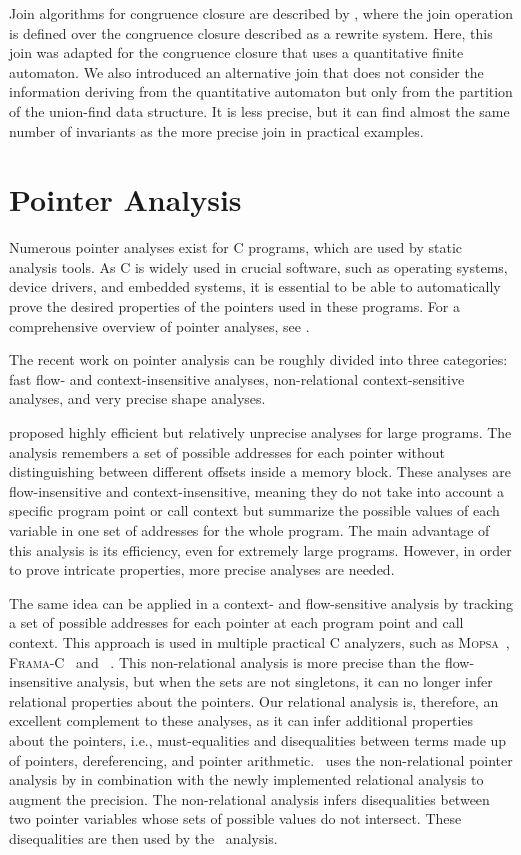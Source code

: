 Join algorithms for congruence closure are described by \textcite{join}, where the join operation is defined over the congruence closure described as a rewrite system.
Here, this join was adapted for the congruence closure that uses a quantitative finite automaton.
We also introduced an alternative join that does not consider the information deriving from the quantitative automaton but only from the partition of the union-find data structure.
It is less precise, but it can find almost the same number of invariants as the more precise join in practical examples.

\section{Pointer Analysis}

Numerous pointer analyses exist for C programs, which are used by static analysis tools.
As C is widely used in crucial software, such as operating systems, device drivers, and embedded systems, it is essential to be able to automatically prove the desired properties of the pointers used in these programs.
For a comprehensive overview of pointer analyses, see \textcite{pointeranalysis}.

The recent work on pointer analysis can be roughly divided into three categories: fast flow- and context-insensitive analyses, non-relational context-sensitive analyses, and very precise shape analyses.

\textcite{Andersen,Steensgaard} proposed highly efficient but relatively unprecise analyses for large programs.
The analysis remembers a set of possible addresses for each pointer without distinguishing between different offsets inside a memory block.
These analyses are flow-insensitive and context-insensitive, meaning they do not take into account a specific program point or call context but summarize the possible values of each variable in one set of addresses for the whole program.
The main advantage of this analysis is its efficiency, even for extremely large programs.
However, in order to prove intricate properties, more precise analyses are needed.

The same idea can be applied in a context- and flow-sensitive analysis by tracking a set of possible addresses for each pointer at each program point and call context.
This approach is used in multiple practical C analyzers, such as \textsc{Mopsa}~\cite{mopsa}, \textsc{Frama-C}~\cite{framac,Bühler2024} and \goblint~\cite{goblint}.
This non-relational analysis is more precise than the flow-insensitive analysis, but when the sets are not singletons, it can no longer infer relational properties about the pointers.
Our relational analysis is, therefore, an excellent complement to these analyses, as it can infer additional properties about the pointers, i.e., must-equalities and disequalities between terms made up of pointers, dereferencing, and pointer arithmetic.
\cpo\ uses the non-relational pointer analysis by \textcite{goblint} in combination with the newly implemented relational analysis to augment the precision.
The non-relational analysis infers disequalities between two pointer variables whose sets of possible values do not intersect.
These disequalities are then used by the \cpo\ analysis.

